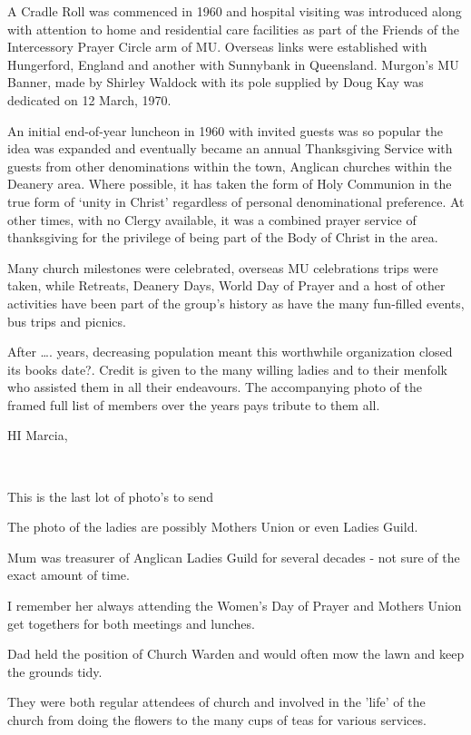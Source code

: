 A Cradle Roll was commenced in 1960 and hospital visiting was introduced along with attention to home and residential care facilities as part of the Friends of the Intercessory Prayer Circle arm of MU. Overseas links were established with Hungerford, England and another with Sunnybank in Queensland. Murgon's MU Banner, made by Shirley Waldock with its pole supplied by Doug Kay was dedicated on 12 March, 1970.

An initial end-of-year luncheon in 1960 with invited guests was so popular the idea was expanded and eventually became an annual Thanksgiving Service with guests from other denominations within the town, Anglican churches within the Deanery area. Where possible, it has taken the form of Holy Communion in the true form of `unity in Christ' regardless of personal denominational preference. At other times, with no Clergy available, it was a combined prayer service of thanksgiving for the privilege of being part of the Body of Christ in the area.

Many church milestones were celebrated, overseas MU celebrations trips were taken, while Retreats, Deanery Days, World Day of Prayer and a host of other activities have been part of the group's history as have the many fun-filled events, bus trips and picnics.

After \ldots. years, decreasing population meant this worthwhile organization closed its books date?. Credit is given to the many willing ladies and to their menfolk who assisted them in all their endeavours. The accompanying photo of the framed full list of members over the years pays tribute to them all.

HI Marcia,

~

This is the last lot of photo's to send

The photo of the ladies are possibly Mothers Union or even Ladies Guild.

Mum was treasurer of Anglican Ladies Guild for several decades - not sure of the exact amount of time.

I remember her always attending the Women's Day of Prayer and Mothers Union get togethers for both meetings and lunches.

Dad held the position of Church Warden and would often mow the lawn and keep the grounds tidy.

They were both regular attendees of church and involved in the 'life' of the church from doing the flowers to the many cups of teas for various services.

